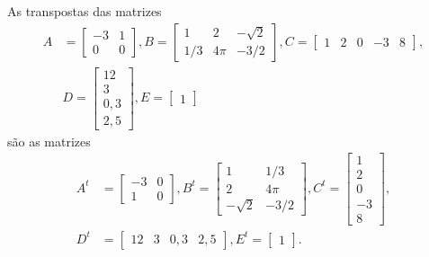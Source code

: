 \documentclass{beamer}
\begin{document}
  \begin{frame}
    \begin{exemplos}
      As transpostas das matrizes
      \begin{align*}
        A &= \begin{bmatrix}
            -3 & 1\\
            0 & 0
          \end{bmatrix},
          B = \begin{bmatrix}
            1 & 2 & -\sqrt{2}\\
            1/3 & 4\pi & -3/2
          \end{bmatrix},
          C = \begin{bmatrix}
            1 & 2 & 0 & -3 & 8
          \end{bmatrix},\\
          &D = \begin{bmatrix}
            12\\
            3\\
            0,3\\
            2,5
          \end{bmatrix},
          E = \begin{bmatrix}
            1
          \end{bmatrix}
      \end{align*}
      são as matrizes
      \begin{align*}
        A^t &= \begin{bmatrix}
            -3 & 0\\
            1 & 0
          \end{bmatrix},
          B^t = \begin{bmatrix}
            1 & 1/3\\
            2 & 4\pi\\
            -\sqrt{2} & -3/2
          \end{bmatrix},
          C^t= \begin{bmatrix}
            1 \\ 2 \\ 0 \\ -3 \\ 8
          \end{bmatrix},\\
          D^t &= \begin{bmatrix}
            12 & 3 & 0,3 & 2,5
          \end{bmatrix},
          E^t = \begin{bmatrix}
            1
          \end{bmatrix}.
      \end{align*}
    \end{exemplos}
  \end{frame}
\end{document}
